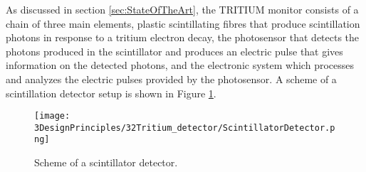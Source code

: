 As discussed in section \ref{sec:StateOfTheArt}, the TRITIUM monitor consists of a chain of three main elements, plastic scintillating fibres that produce scintillation photons in response to a tritium electron decay, the photosensor that detects the photons produced in the scintillator and produces an electric pulse that gives information on the detected photons, and the electronic system which processes and analyzes the electric pulses provided by the photosensor. A scheme of a scintillation detector setup is shown in Figure \ref{fig:ScintillatorDetector}.

\begin{figure}[hbtp]
\texttt{[image: 3DesignPrinciples/32Tritium\_detector/ScintillatorDetector.png]}
\centering
\caption{Scheme of a scintillator detector.\label{fig:ScintillatorDetector}}
\end{figure}
